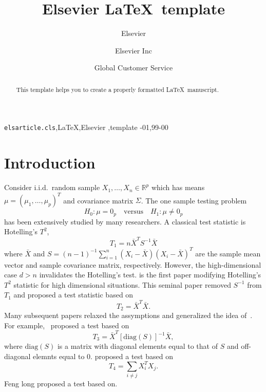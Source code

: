 \documentclass[review]{elsarticle}
\theoremstyle{plain}
\theoremstyle{definition}
\theoremstyle{remark}
\begin{document}
\begin{frontmatter}

\title{Elsevier \LaTeX\ template}

\author{Elsevier}
\address{Radarweg 29, Amsterdam}

\author[mymainaddress,mysecondaryaddress]{Elsevier Inc}

\author[mysecondaryaddress]{Global Customer Service}

\address[mymainaddress]{1600 John F Kennedy Boulevard, Philadelphia}
\address[mysecondaryaddress]{360 Park Avenue South, New York}

\begin{abstract}
This template helps you to create a properly formatted \LaTeX\ manuscript.
\end{abstract}

\begin{keyword}
\texttt{elsarticle.cls}\sep \LaTeX\sep Elsevier \sep template
-01\sep  99-00
\end{keyword}

\end{frontmatter}

\linenumbers


\section{Introduction}

Consider i.i.d.\ random sample $X_{1},\ldots,X_{n}\in \mathbb{R}^p$ which has means $\mu={(\mu_1,\ldots,\mu_p)}^T$ and covariance matrix $\Sigma$. The one sample testing problem
\begin{equation}
    H_0:\mu=0_p\quad \textrm{versus} \quad H_1:\mu\neq 0_p
\end{equation}
has been extensively studied by many researchers.
A classical test statistic is Hotelling's $T^2$, 
    $$
    T_{1}=n\bar{X}^T S^{-1}\bar{X}
    $$
where $\bar{X}$ and $S=(n-1)^{-1}\sum_{i=1}^n (X_i-\bar{X}) (X_i-\bar{X})^T$ are the sample mean vector and sample covariance matrix, respectively.
However, the high-dimensional case $d>n$ invalidates the Hotelling's test.
\cite{Bai1996Efiect} is the first paper modifying Hotelling's $T^2$ statistic for high dimensional situations.
This seminal paper removed $S^{-1}$ from $T_1$ and proposed a test statistic based on
$$
T_2=\bar{X}^T\bar{X}.
$$
Many subsequent papers relaxed the assymptions and generalized the idea of~\cite{Bai1996Efiect}.
For example,~\cite{Srivastava2009A} proposed a test based on
$$
T_3=\bar{X}^T {[\mathrm{diag}(S)]}^{-1} \bar{X},
$$
where $\mathrm{diag}(S)$ is a matrix with diagonal elements equal to that of $S$ and off-diagonal elemnts equal to $0$.
\cite{Chen2010A} proposed a test based on
$$
T_4=\sum_{i\neq j}X_i^T X_j.
$$
Feng long proposed a test based on.
\end{document}
